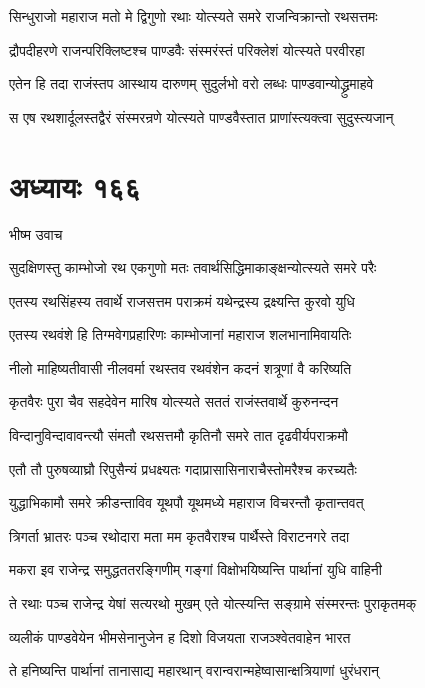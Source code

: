 \twolineshloka
{सिन्धुराजो महाराज मतो मे द्विगुणो रथाः}
{योत्स्यते समरे राजन्विक्रान्तो रथसत्तमः}


\twolineshloka
{द्रौपदीहरणे राजन्परिक्लिष्टश्च पाण्डवैः}
{संस्मरंस्तं परिक्लेशं योत्स्यते परवीरहा}


\twolineshloka
{एतेन हि तदा राजंस्तप आस्थाय दारुणम्}
{सुदुर्लभो वरो लब्धः पाण्डवान्योद्ध्रुमाहवे}


\twolineshloka
{स एष रथशार्दूलस्तद्वैरं संस्मरन्रणे}
{योत्स्यते पाण्डवैस्तात प्राणांस्त्यक्त्वा सुदुस्त्यजान्}


\chapter{अध्यायः १६६}
\twolineshloka
{भीष्म उवाच}
{}


\twolineshloka
{सुदक्षिणस्तु काम्भोजो रथ एकगुणो मतः}
{तवार्थसिद्धिमाकाङ्क्षन्योत्स्यते समरे परैः}


\twolineshloka
{एतस्य रथसिंहस्य तवार्थे राजसत्तम}
{पराक्रमं यथेन्द्रस्य द्रक्ष्यन्ति कुरवो युधि}


\twolineshloka
{एतस्य रथवंशे हि तिग्मवेगप्रहारिणः}
{काम्भोजानां महाराज शलभानामिवायतिः}


\twolineshloka
{नीलो माहिष्यतीवासी नीलवर्मा रथस्तव}
{रथवंशेन कदनं शत्रूणां वै करिष्यति}


\twolineshloka
{कृतवैरः पुरा चैव सहदेवेन मारिष}
{योत्स्यते सततं राजंस्तवार्थे कुरुनन्दन}


\twolineshloka
{विन्दानुविन्दावावन्त्यौ संमतौ रथसत्तमौ}
{कृतिनौ समरे तात दृढवीर्यपराक्रमौ}


\twolineshloka
{एतौ तौ पुरुषव्याघ्रौ रिपुसैन्यं प्रधक्ष्यतः}
{गदाप्रासासिनाराचैस्तोमरैश्च करच्यतैः}


\twolineshloka
{युद्धाभिकामौ समरे क्रीडन्ताविव यूथपौ}
{यूथमध्ये महाराज विचरन्तौ कृतान्तवत्}


\twolineshloka
{त्रिगर्ता भ्रातरः पञ्च रथोदारा मता मम}
{कृतवैराश्च पार्थैस्ते विराटनगरे तदा}


\twolineshloka
{मकरा इव राजेन्द्र समुद्धततरङ्गिणीम्}
{गङ्गां विक्षोभयिष्यन्ति पार्थानां युधि वाहिनी}


\twolineshloka
{ते रथाः पञ्च राजेन्द्र येषां सत्यरथो मुखम्}
{एते योत्स्यन्ति सङ्ग्रामे संस्मरन्तः पुराकृतमक्}


\twolineshloka
{व्यलीकं पाण्डवेयेन भीमसेनानुजेन ह}
{दिशो विजयता राजञ्श्वेतवाहेन भारत}


\twolineshloka
{ते हनिष्यन्ति पार्थानां तानासाद्य महारथान्}
{वरान्वरान्महेष्वासान्क्षत्रियाणां धुरंधरान्}


